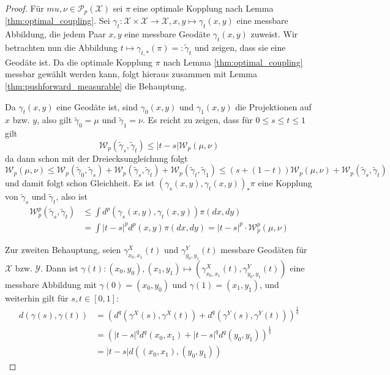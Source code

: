 \begin{proof}
    Für $mu, \nu \in \mathcal{P}_p(\mathcal{X})$ sei $\pi$ eine optimale Kopplung nach Lemma \ref{thm:optimal_coupling}. Sei $\gamma_t: \mathcal{X}\times \mathcal{X} \rightarrow \mathcal{X}, x,y \mapsto \gamma_t(x,y)$ eine messbare Abbildung, die jedem Paar $x,y$ eine messbare Geodäte $\gamma_t(x,y)$ zuweist. Wir betrachten nun die Abbildung $t \mapsto \gamma_{t,*}(\pi)=:\tilde{\gamma}_t$ und zeigen, dass sie eine Geodäte ist. Da die optimale Kopplung $\pi$ nach Lemma \ref{thm:optimal_coupling} messbar gewählt werden kann, folgt hieraus zusammen mit Lemma \ref{thm:pushforward_measurable} die Behauptung. 

    Da $\gamma_t(x,y)$ eine Geodäte ist, sind $\gamma_0(x,y)$ und $\gamma_1(x,y)$ die Projektionen auf $x$ bzw. $y$, also gilt $\tilde{\gamma}_0=\mu$ und $\tilde{\gamma}_1=\nu$. Es reicht zu zeigen, dass für $0\leq s\leq t\leq 1$ gilt
    $$\mathcal{W}_p(\tilde{\gamma}_s, \tilde{\gamma}_t) \leq |t-s|\mathcal{W}_p(\mu, \nu)$$
    da dann schon mit der Dreiecksungleichung folgt
    $$\mathcal{W}_p(\mu, \nu) \leq \mathcal{W}_p(\tilde{\gamma}_0, \tilde{\gamma}_s) + \mathcal{W}_p(\tilde{\gamma}_s, \tilde{\gamma}_t) + \mathcal{W}_p(\tilde{\gamma}_t, \tilde{\gamma}_1) \leq (s + (1-t))\mathcal{W}_p(\mu, \nu) + \mathcal{W}_p(\tilde{\gamma}_s, \tilde{\gamma}_t)$$
    und damit folgt schon Gleichheit. Es ist $(\gamma_s(x,y), \gamma_t(x,y))_*\pi$ eine Kopplung von $\tilde{\gamma}_s$ und $\tilde{\gamma}_t$, also ist 
    \begin{align*}
        \mathcal{W}_p^p(\tilde{\gamma}_s, \tilde{\gamma}_t) &\leq \int d^p(\gamma_s(x,y), \gamma_t(x,y)) \pi(dx,dy) \\
        &= \int |t-s|^pd^p(x,y)\pi(dx,dy) = |t-s|^p\cdot\mathcal{W}_p^p(\mu, \nu)
    \end{align*}

    Zur zweiten Behauptung, seien $\gamma^X_{x_0,x_1}(t)$ und $\gamma^Y_{y_0, y_1}(t)$ messbare Geodäten für $\mathcal{X}$ bzw. $\mathcal{Y}$. Dann ist $\gamma(t): (x_0, y_0), (x_1, y_1) \mapsto \left(\gamma^X_{x_0,x_1}(t), \gamma^Y_{y_0,y_1}(t)\right)$ eine messbare Abbildung mit $\gamma(0)=(x_0, y_0)$ und $\gamma(1) = (x_1, y_1)$, und weiterhin gilt für $s,t\in [0,1]$:
    \begin{align*}
        d(\gamma(s), \gamma(t)) &= \left(d^q(\gamma^X(s), \gamma^X(t)) + d^q(\gamma^Y(s), \gamma^Y(t))\right)^\frac{1}{q} \\
        &= \left(|t-s|^q d^q(x_0, x_1) + |t-s|^q d^q(y_0, y_1)\right)^\frac{1}{q} \\
        &= |t-s| d((x_0, x_1), (y_0, y_1))
    \end{align*}


\end{proof}
